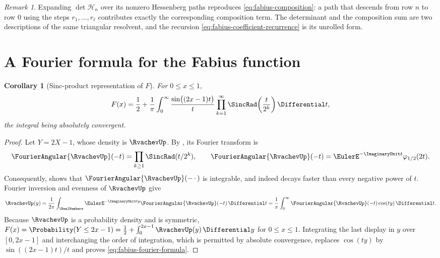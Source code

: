 \documentclass[11pt,a4paper,oneside,openany]{book}
\newtheorem{corollary}[corollary]{Corollary}
\theoremstyle{definition}
\theoremstyle{remark}
\newtheorem{remark}[remark]{Remark}
\begin{document}
\begin{remark}
Expanding $\det\mathcal H_n$ over its nonzero Hessenberg paths reproduces
\eqref{eq:fabius-composition}: a path that descends from row $n$ to row $0$ using the
steps $r_1,\ldots,r_\ell$ contributes exactly the corresponding composition term.  The
determinant and the composition sum are two descriptions of the same triangular
resolvent, and the recursion \eqref{eq:fabius-coefficient-recurrence} is its unrolled form.
\end{remark}

\section{A Fourier formula for the Fabius function}

\begin{corollary}[Sinc-product representation of $F$]\label{cor:fabius-fourier-formula}
For $0\le x\le1$,
\begin{equation}\label{eq:fabius-fourier-formula}
 F(x)=\frac12
 +\frac1\pi\int_0^{\infty}
 \frac{\sin\bigl((2x-1)t\bigr)}{t}
 \prod_{k=1}^{\infty}\SincRad\!\left(\frac t{2^k}\right)\Differential t,
\end{equation}
the integral being absolutely convergent.
\end{corollary}

\begin{proof}
Let $Y=2X-1$, whose density is $\RvachevUp$.  By
, its Fourier transform is
\[
 \FourierAngular{\RvachevUp}(-t)=\prod_{k\ge1}\SincRad(t/2^k),
 \qquad
 \FourierAngular{\RvachevUp}(-t)
 =\EulerE^{-\ImaginaryUnit t}\varphi_{1/2}(2t).
\]
Consequently,
 shows that
$\FourierAngular{\RvachevUp}(-\,\cdot\,)$ is integrable, and indeed decays faster than every
negative power of $t$.  Fourier inversion and evenness of $\RvachevUp$ give
\[
\RvachevUp(y)=\frac1{2\pi}\int_{\RealNumbers}\EulerE^{-\ImaginaryUnit ty}\FourierAngular{\RvachevUp}(-t)\,\Differential t
=\frac1\pi\int_0^{\infty}\FourierAngular{\RvachevUp}(-t)\cos(ty)\,\Differential t .
\]
Because $\RvachevUp$ is a probability density and is symmetric,
$F(x)=\Probability(Y\le2x-1)=\tfrac12+\int_0^{2x-1}\RvachevUp(y)\,\Differential y$ for
$0\le x\le1$.  Integrating the last display in $y$ over $[0,2x-1]$ and interchanging the
order of integration, which is permitted by absolute convergence, replaces
$\cos(ty)$ by $\sin((2x-1)t)/t$ and proves \eqref{eq:fabius-fourier-formula}.
\end{proof}
\end{document}
